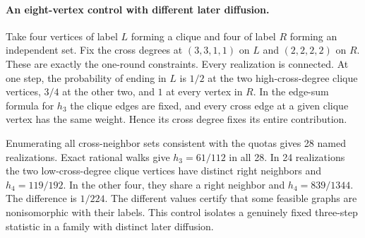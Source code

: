 \documentclass[11pt]{article}
\begin{document}
\paragraph{An eight-vertex control with different later diffusion.}
Take four vertices of label $L$ forming a clique and four of label $R$ forming an independent set. Fix the cross degrees at $(3,3,1,1)$ on $L$ and $(2,2,2,2)$ on $R$. These are exactly the one-round constraints. Every realization is connected. At one step, the probability of ending in $L$ is $1/2$ at the two high-cross-degree clique vertices, $3/4$ at the other two, and $1$ at every vertex in $R$. In the edge-sum formula for $h_3$ the clique edges are fixed, and every cross edge at a given clique vertex has the same weight. Hence its cross degree fixes its entire contribution.

Enumerating all cross-neighbor sets consistent with the quotas gives 28 named realizations. Exact rational walks give $h_3=61/112$ in all 28. In 24 realizations the two low-cross-degree clique vertices have distinct right neighbors and $h_4=119/192$. In the other four, they share a right neighbor and $h_4=839/1344$. The difference is $1/224$. The different values certify that some feasible graphs are nonisomorphic with their labels. This control isolates a genuinely fixed three-step statistic in a family with distinct later diffusion.
\end{document}
